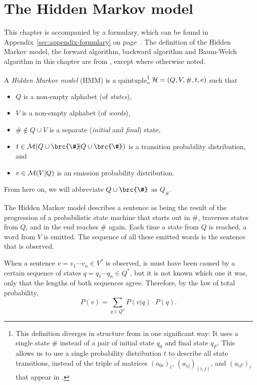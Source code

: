 \chapter{The Hidden Markov model}

This chapter is accompanied by a formulary, which can be found in
Appendix~\ref{sec:appendix-formulary} on page~\pageref{sec:appendix-formulary}.
The definition of the Hidden Markov model, the forward algorithm, backward
algorithm and Baum-Welch algorithm in this chapter are from
\cite[pp.~210]{jm09}, except where otherwise noted.

\begin{definition}
 A \emph{Hidden Markov model} (HMM) is a quintuple\footnote{This definition
 diverges in structure from \cite{jm09} in one significant way: It uses a
 single state $\#$ instead of a pair of initial state $q_0$ and final state
 $q_F$. This allows us to use a single probability distribution $t$ to describe
 all state transitions, instead of the triple of matrices $(a_{0i})_i$,
 $(a_{ij})_{(i,j)}$, and $(a_{iF})_i$ that appear in \cite{jm09}.} $\mathcal H =
 (Q,V,\#,t,e)$ such that
 \begin{itemize}\setlength\itemsep{-0.3em}
  \item $Q$ is a non-empty alphabet (of \emph{states}),
  \item $V$ is a non-empty alphabet (of \emph{words}),
  \item $\#\notin Q\cup V$ is a separate (\emph{initial} and \emph{final}) state,
  \item $t\in\um(Q\cup\brc{\#}\!|Q\cup\brc{\#})$ is a transition probability distribution, and
  \item $e\in\mathcal M(V|Q)$ is an emission probability distribution. \qedhere
 \end{itemize}
\end{definition}

From here on, we will abbreviate $Q\cup\brc{\#}$ as $Q_\#$.

The Hidden Markov model describes a sentence as being the result of the
progression of a probabilistic state machine that starts out in $\#$, traverses
states from $Q$, and in the end reaches $\#$ again. Each time a state from $Q$
is reached, a word from $V$ is emitted. The sequence of all these emitted words
is the sentence that is observed.

When a sentence $v = v_1\cdots v_n\in V^*$ is observed, is must have been
caused by a certain sequence of states $q = q_1\cdots q_n\in Q^*$, but it is
not known which one it was, only that the lengths of both sequences agree.
Therefore, by the law of total probability,
\[
 P(v) = \sum_{q\in Q^n} P(v|q) \cdot P(q).
\]

